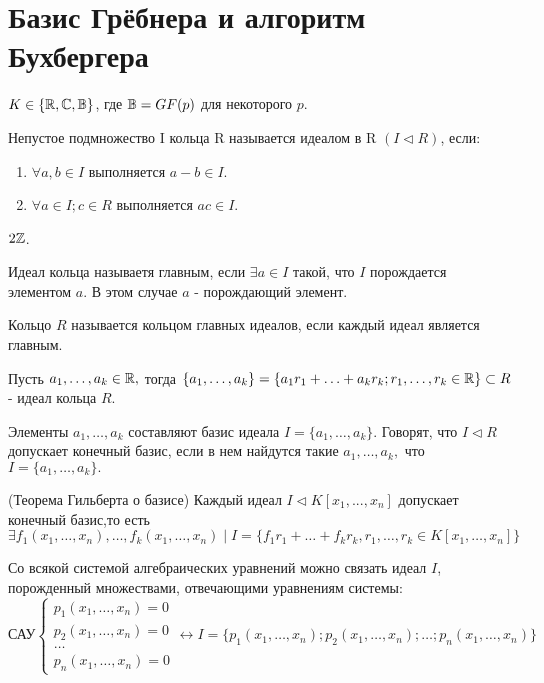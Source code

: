 \section {Базис Грёбнера и алгоритм Бухбергера}

$ K \in \{ \mathbb{R}, \mathbb{C}, \mathbb{B} \} $, где $\mathbb{B} = GF(p)$ для некоторого $p$.

\opr Непустое подмножество I кольца R называется идеалом в R $(I \triangleleft R)$, если:
\begin{enumerate}
	\item $\forall a,b \in I$ выполняется $a - b \in I$. 
	\item $\forall a \in I; c \in R$ выполняется $ac \in I$.
\end{enumerate}

\example $2\mathbb{Z}$.

\opr Идеал кольца называетя главным, если $\exists a \in I$ такой, что $I$ порождается элементом $a$. В этом случае $a$ - порождающий элемент.

\opr Кольцо $R$ называется кольцом главных идеалов, если каждый идеал является главным.

\utv Пусть $a_1,\ldots,a_k \in \mathbb{R},$ тогда $\{a_1,\ldots,a_k\} = \{ a_1r_1+\ldots+a_kr_k; r_1,\ldots,r_k \in \mathbb{R}\} \subset R$ - идеал кольца $R$.

\opr Элементы $a_1,\ldots,a_k$ составляют базис идеала $I = \{a_1,\ldots,a_k\}.$ Говорят, что $I \triangleleft R$ допускает конечный базис, если в нем найдутся такие $a_1,\ldots,a_k,$ что $I = \{a_1,\ldots,a_k\}.$

\thri (Теорема Гильберта о базисе) Каждый идеал $I \triangleleft K[x_1,...,x_n]$ допускает конечный базис,то есть $\exists  f_1(x_1,\ldots,x_n),\ldots,f_k(x_1,\ldots,x_n) \mid I = \{ f_1r_1 + \ldots + f_kr_k, r_1,\ldots,r_k \in K[x_1,\ldots,x_n] \}$ 
\par
Со всякой системой алгебраических уравнений можно связать идеал $I$, порожденный множествами, отвечающими уравнениям системы:
\begin{equation*}
	\text{САУ}
	\begin{cases}
	   	p_1(x_1,\ldots,x_n) = 0\\
	   	p_2(x_1,\ldots,x_n) = 0\\
		\ldots\\
		p_n(x_1,\ldots,x_n) = 0
	\end{cases}
	\leftrightarrow I = \{p_1(x_1,\ldots,x_n);p_2(x_1,\ldots,x_n);\ldots;p_n(x_1,\ldots,x_n)\}
\end{equation*}

